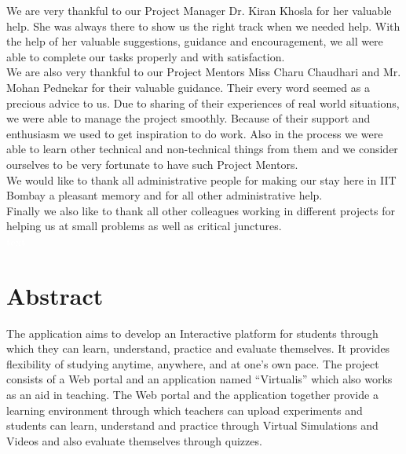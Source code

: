 \documentclass[12pt]{report}
\begin{document}
We are very thankful to our Project Manager Dr. Kiran Khosla for her valuable help. She was always there to show us the right track when we needed help. With the help of her valuable suggestions, guidance and encouragement, we all were able to complete our tasks properly and with satisfaction. \\

We are also very thankful to our Project Mentors Miss Charu Chaudhari and Mr. Mohan Pednekar for their valuable guidance. Their every word seemed as a precious advice to us. Due to sharing of their experiences of real world situations, we were able to manage the project smoothly. Because of their support and enthusiasm we used to get inspiration to do work. Also in the process we were able to learn other technical and non-technical things from them and we consider ourselves to be very fortunate to have such Project Mentors. \\

We would like to thank all administrative people for making our stay here in IIT Bombay a pleasant memory and for all other administrative help.
\\
Finally we also like to thank all other colleagues working in different projects for helping us at small problems as well as critical junctures.
\\

 \pagebreak \thispagestyle{empty} \textcolor{white}{text} \pagebreak



\chapter*{Abstract}
\setcounter{page}{1}
The application aims to develop an Interactive platform for students through which they can learn, understand, practice and evaluate themselves. It provides flexibility of studying anytime, anywhere, and at one's own pace. The project consists of a Web portal and an application named ``Virtualis” which also works as an aid in teaching. The Web portal and the application together provide a learning environment through which teachers can upload experiments and students can learn, understand and practice through Virtual Simulations and Videos and also evaluate themselves through quizzes.\newline
\end{document}
